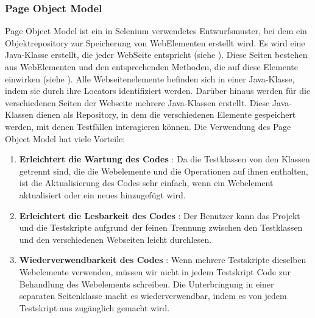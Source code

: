 \subsubsection{Page Object Model}

Page Object Model ist ein in Selenium verwendetes Entwurfsmuster,
bei dem ein Objektrepository zur Speicherung von WebElementen
erstellt wird. Es wird eine Java-Klasse erstellt, die jeder WebSeite
entspricht (siehe ). Diese Seiten bestehen aus WebElementen und den
entsprechenden Methoden, die auf diese Elemente einwirken (siehe ).
Alle Webseitenelemente befinden sich in einer Java-Klasse, indem sie durch
ihre Locators identifiziert werden.  Darüber hinaus werden für die
verschiedenen Seiten der Webseite mehrere Java-Klassen erstellt. Diese
Java-Klassen dienen als Repository, in dem die verschiedenen Elemente
gespeichert werden, mit denen Testfällen interagieren können. Die Verwendung
des Page Object Model hat viele Vorteile:

\begin{enumerate}
    \item \textbf{Erleichtert die Wartung des Codes} : Da die Testklassen von den
    Klassen getrennt sind, die die Webelemente und die Operationen auf
    ihnen enthalten, ist die Aktualisierung des Codes sehr einfach, wenn
    ein Webelement aktualisiert oder ein neues hinzugefügt wird.
    \item \textbf{Erleichtert die Lesbarkeit des Codes} : Der Benutzer kann das Projekt
    und die Testskripte aufgrund der feinen Trennung zwischen den Testklassen
    und den verschiedenen Webseiten leicht durchlesen.
    \item \textbf{Wiederverwendbarkeit des Codes} : Wenn mehrere Testskripte dieselben
    Webelemente verwenden, müssen wir nicht in jedem Testskript Code zur
    Behandlung des Webelements schreiben. Die Unterbringung in einer
    separaten Seitenklasse macht es wiederverwendbar, indem es von jedem
    Testskript aus zugänglich gemacht wird.
\end{enumerate}

